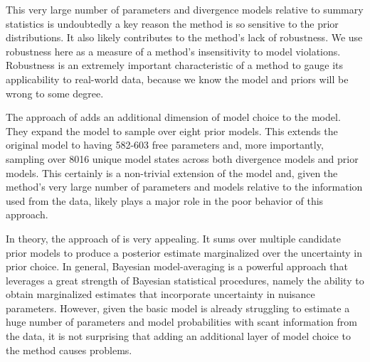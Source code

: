\documentclass[letterpaper,12pt]{article}
\begin{document}
\begin{linenumbers}
This very large number of parameters and divergence models relative to 
summary statistics is undoubtedly a key reason the method is so sensitive
to the prior distributions.
It also likely contributes to the method's lack of robustness.
We use robustness here as a measure of a method's insensitivity to model
violations.
Robustness is an extremely important characteristic of a method to gauge its
applicability to real-world data, because we know the model and priors will be
wrong to some degree.

The approach of \citet{Hickerson2013} adds an additional dimension of model
choice to the model. They expand the model to sample over eight prior models.
This extends the original model to having 582-603 free parameters and, more
importantly, sampling over 8016 unique model states across both divergence
models and prior models.
This certainly is a non-trivial extension of the model and, given the method's
very large number of parameters and models relative to the information used
from the data, likely plays a major role in the poor behavior of this approach.

In theory, the approach of \citet{Hickerson2013} is very appealing.  It sums
over multiple candidate prior models to produce a posterior estimate
marginalized over the uncertainty in prior choice.
In general, Bayesian model-averaging is a powerful approach that leverages a
great strength of Bayesian statistical procedures, namely the ability to
obtain marginalized estimates that incorporate uncertainty in nuisance
parameters.
However, given the basic \msb model is already struggling to estimate
a huge number of parameters and model probabilities with scant information
from the data, it is not surprising that adding an additional layer of
model choice to the method causes problems.


\end{linenumbers}
\end{document}
